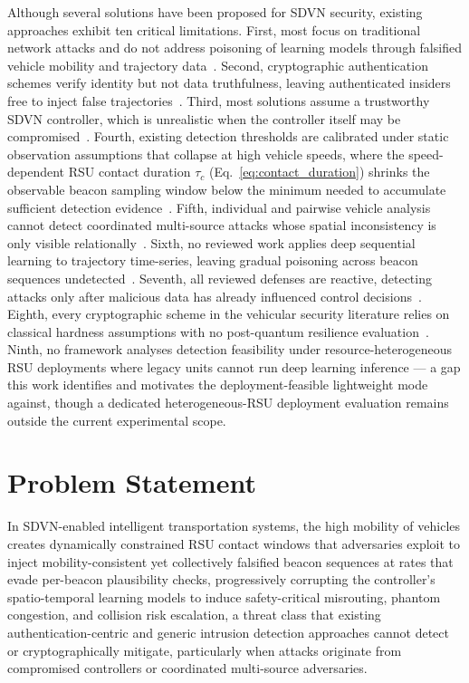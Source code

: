 \documentclass[12pt, a4paper]{report}
\begin{document}
Although several solutions have been proposed for SDVN security,
existing approaches exhibit ten critical limitations. First, most
focus on traditional network attacks and do not address poisoning of
learning models through falsified vehicle mobility and trajectory
data~\cite{arif2020, ravi2023}. Second, cryptographic authentication
schemes verify identity but not data truthfulness, leaving
authenticated insiders free to inject false trajectories~\cite{arif2020}.
Third, most solutions assume a trustworthy SDVN controller, which is
unrealistic when the controller itself may be compromised~\cite{vehcom}.
Fourth, existing detection thresholds are calibrated under static
observation assumptions that collapse at high vehicle speeds, where
the speed-dependent RSU contact duration $\tau_c$
(Eq.~\eqref{eq:contact_duration}) shrinks the observable beacon
sampling window below the minimum needed to accumulate sufficient
detection evidence~\cite{ghaleb2014}. Fifth, individual and pairwise vehicle
analysis cannot detect coordinated multi-source attacks whose spatial
inconsistency is only visible relationally~\cite{ghaleb2014}. Sixth,
no reviewed work applies deep sequential learning to trajectory
time-series, leaving gradual poisoning across beacon sequences
undetected~\cite{raja2021}. Seventh, all reviewed defenses are
reactive, detecting attacks only after malicious data has already
influenced control decisions~\cite{hong2015, raja2021}. Eighth, every
cryptographic scheme in the vehicular security literature relies on
classical hardness assumptions with no post-quantum resilience
evaluation~\cite{faleh2025csasv, ahmed2022blockchain}. Ninth, no framework analyses detection feasibility under
resource-heterogeneous RSU deployments where legacy units cannot
run deep learning inference --- a gap this work identifies and
motivates the deployment-feasible lightweight mode against, though
a dedicated heterogeneous-RSU deployment evaluation remains outside
the current experimental scope.

\section{Problem Statement}
In SDVN-enabled intelligent transportation systems, the high mobility of
vehicles creates dynamically constrained RSU contact windows that adversaries
exploit to inject mobility-consistent yet collectively falsified beacon
sequences at rates that evade per-beacon plausibility checks, progressively
corrupting the controller's spatio-temporal learning models to induce
safety-critical misrouting, phantom congestion, and collision risk
escalation, a threat class that existing authentication-centric and
generic intrusion detection approaches cannot detect or cryptographically
mitigate, particularly when attacks originate from compromised controllers
or coordinated multi-source adversaries.
\end{document}
